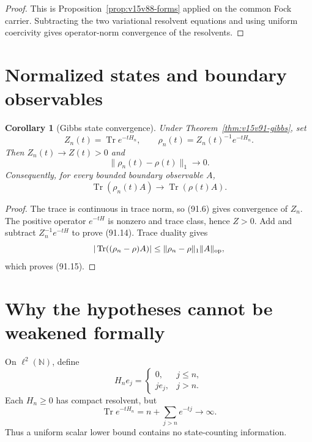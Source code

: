 \documentclass[11pt]{article}
\newtheorem{corollary}[theorem]{Corollary}
\theoremstyle{remark}
\begin{document}
\begin{proof}
This is Proposition~\ref{prop:v15v88-forms} applied on the common
Fock carrier.  Subtracting the two variational resolvent equations
and using uniform coercivity gives operator-norm convergence of
the resolvents.
\end{proof}

\section{Normalized states and boundary observables}

\begin{corollary}[Gibbs state convergence]
\label{cor:v15v91-states}
Under Theorem~\ref{thm:v15v91-gibbs}, set
\[
 Z_n(t)=\operatorname{Tr}e^{-tH_n},\qquad
 \rho_n(t)=Z_n(t)^{-1}e^{-tH_n}.                       \tag{91.13}
\]
Then \(Z_n(t)\to Z(t)>0\) and
\[
 \|\rho_n(t)-\rho(t)\|_1\to0.                         \tag{91.14}
\]
Consequently, for every bounded boundary observable \(A\),
\[
 \operatorname{Tr}(\rho_n(t)A)
 \longrightarrow\operatorname{Tr}(\rho(t)A).          \tag{91.15}
\]
\end{corollary}

\begin{proof}
The trace is continuous in trace norm, so (91.6) gives convergence
of \(Z_n\).  The positive operator \(e^{-tH}\) is nonzero and trace
class, hence \(Z>0\).  Add and subtract
\(Z_n^{-1}e^{-tH}\) to prove (91.14).  Trace duality gives
\[
 |\operatorname{Tr}((\rho_n-\rho)A)|
 \leq\|\rho_n-\rho\|_1\|A\|_{\rm op},
\]
which proves (91.15).
\end{proof}

\section{Why the hypotheses cannot be weakened formally}

\begin{counterexample}
\label{cnt:v15v91-multiplicity}
On \(\ell^2(\mathbb N)\), define
\[
 H_ne_j=
 \begin{cases}
 0,&j\leq n,\\
 j e_j,&j>n.
 \end{cases}                                          \tag{91.16}
\]
Each \(H_n\geq0\) has compact resolvent, but
\[
 \operatorname{Tr}e^{-tH_n}
 =n+\sum_{j>n}e^{-tj}\longrightarrow\infty.            \tag{91.17}
\]
Thus a uniform scalar lower bound contains no state-counting
information.
\end{counterexample}
\end{document}
